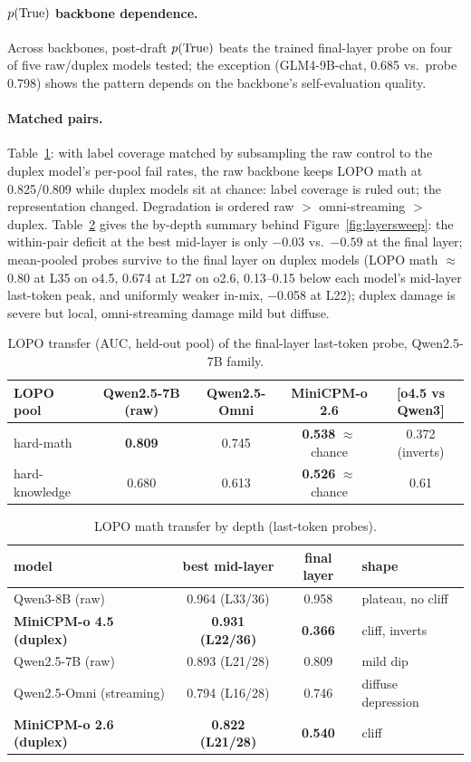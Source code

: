 \paragraph{$p(\mathrm{True})$ backbone dependence.} Across backbones, post-draft
$p(\mathrm{True})$ beats the trained final-layer probe on four of five raw/duplex
models tested; the exception (GLM4-9B-chat, 0.685 vs.\ probe 0.798) shows
the pattern depends on the backbone's self-evaluation quality.

\paragraph{Matched pairs.} Table~\ref{tab:lopo}: with label coverage
matched by subsampling the raw control to the duplex model's per-pool
fail rates, the raw backbone keeps LOPO math at 0.825/0.809 while duplex
models sit at chance: label coverage is ruled out; the
representation changed. Degradation is ordered raw $>$ omni-streaming
$>$ duplex. Table~\ref{tab:sweep} gives the by-depth summary behind
Figure~\ref{fig:layersweep}: the within-pair deficit at the best
mid-layer is only $-0.03$ vs.\ $-0.59$ at the final layer; mean-pooled
probes survive to the final layer on duplex models (LOPO math
$\approx$0.80 at L35 on o4.5, 0.674 at L27 on o2.6, 0.13--0.15
below each model's mid-layer last-token peak, and uniformly weaker
in-mix, $-$0.058 at L22); duplex damage is
severe but local, omni-streaming damage mild but diffuse.

\begin{table}[h]
\centering\small
\caption{LOPO transfer (AUC, held-out pool) of the final-layer
last-token probe, Qwen2.5-7B family.}
\label{tab:lopo}
\begin{tabular}{lcccc}
\toprule
LOPO pool & Qwen2.5-7B (raw) & Qwen2.5-Omni & MiniCPM-o 2.6 & [o4.5 vs Qwen3] \\
\midrule
hard-math & \textbf{0.809} & 0.745 & \textbf{0.538} $\approx$ chance & 0.372 (inverts) \\
hard-knowledge & 0.680 & 0.613 & \textbf{0.526} $\approx$ chance & 0.61 \\
\bottomrule
\end{tabular}
\end{table}

\begin{table}[h]
\centering\small
\caption{LOPO math transfer by depth (last-token probes).}
\label{tab:sweep}
\begin{tabular}{lccl}
\toprule
model & best mid-layer & final layer & shape \\
\midrule
Qwen3-8B (raw) & 0.964 (L33/36) & 0.958 & plateau, no cliff \\
\textbf{MiniCPM-o 4.5 (duplex)} & \textbf{0.931 (L22/36)} & \textbf{0.366} & cliff, inverts \\
Qwen2.5-7B (raw) & 0.893 (L21/28) & 0.809 & mild dip \\
Qwen2.5-Omni (streaming) & 0.794 (L16/28) & 0.746 & diffuse depression \\
\textbf{MiniCPM-o 2.6 (duplex)} & \textbf{0.822 (L21/28)} & \textbf{0.540} & cliff \\
\bottomrule
\end{tabular}
\end{table}

